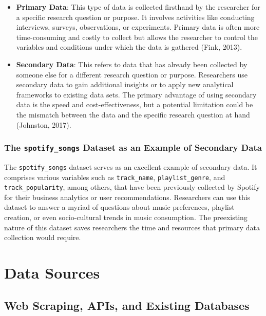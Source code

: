 \documentclass[
]{book}
\begin{document}
\begin{itemize}
\item
  \textbf{Primary Data}: This type of data is collected firsthand by the researcher for a specific research question or purpose. It involves activities like conducting interviews, surveys, observations, or experiments. Primary data is often more time-consuming and costly to collect but allows the researcher to control the variables and conditions under which the data is gathered (Fink, 2013).
\item
  \textbf{Secondary Data}: This refers to data that has already been collected by someone else for a different research question or purpose. Researchers use secondary data to gain additional insights or to apply new analytical frameworks to existing data sets. The primary advantage of using secondary data is the speed and cost-effectiveness, but a potential limitation could be the mismatch between the data and the specific research question at hand (Johnston, 2017).
\end{itemize}

\subsubsection*{\texorpdfstring{The \texttt{spotify\_songs} Dataset as an Example of Secondary Data}{The spotify\_songs Dataset as an Example of Secondary Data}}\label{the-spotify_songs-dataset-as-an-example-of-secondary-data}

The \texttt{spotify\_songs} dataset serves as an excellent example of secondary data. It comprises various variables such as \texttt{track\_name}, \texttt{playlist\_genre}, and \texttt{track\_popularity}, among others, that have been previously collected by Spotify for their business analytics or user recommendations. Researchers can use this dataset to answer a myriad of questions about music preferences, playlist creation, or even socio-cultural trends in music consumption. The preexisting nature of this dataset saves researchers the time and resources that primary data collection would require.

\section{Data Sources}\label{data-sources}

\subsection*{Web Scraping, APIs, and Existing Databases}\label{web-scraping-apis-and-existing-databases}
\end{document}

